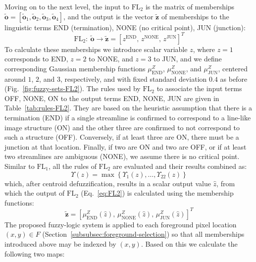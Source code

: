 \documentclass[twocolumn,natbib]{svjour3}
\begin{document}
Moving on to the next level, the input to $\mathrm{FL}_{2}$ is the matrix of memberships $\tilde{\mathbf{o}}=\left[\tilde{\mathbf{o}}_{1},\tilde{\mathbf{o}}_{2},\tilde{\mathbf{o}}_{3},\tilde{\mathbf{o}}_{4}\right]$, and the output is the vector $\tilde{\mathbf{z}}$ of memberships to the linguistic terms END (termination), NONE (no critical point), JUN (junction):
\begin{equation}
\mathrm{FL}_{2}\!:\ \tilde{\mathbf{o}} \rightarrow \tilde{\mathbf{z}} = \left[z^{\textrm{END}}\!,\, z^{\textrm{NONE}}\!,\, z^{\textrm{JUN}}\right]^T
\label{eq:FL2}
\end{equation}
To calculate these memberships we introduce scalar variable $z$, where $z=1$ corresponds to END, $z=2$ to NONE, and $z=3$ to JUN, and we define corresponding Gaussian membership functions $\mu_{\textrm{END}}^{Z}$, $\mu_{\textrm{NONE}}^{Z}$, and $\mu_{\textrm{JUN}}^{Z}$, centered around $1$, $2$, and $3$, respectively, and with fixed standard deviation $0.4$ as before (Fig.~\ref{fig:fuzzy-sets-FL2}). The rules used by $\mathrm{FL}_{2}$ to associate the input terms OFF, NONE, ON to the output terms END, NONE, JUN are given in Table~\ref{tab:rules-FL2}. They are based on the heuristic assumption that there is a termination (END) if a single streamline is confirmed to correspond to a line-like image structure (ON) and the other three are confirmed to not correspond to such a structure (OFF). Conversely, if at least three are ON, there must be a junction at that location. Finally, if two are ON and two are OFF, or if at least two streamlines are ambiguous (NONE), we assume there is no critical point. Similar to $\mathrm{FL}_{1}$, all the rules of $\mathrm{FL}_{2}$ are evaluated and their results combined as:
\begin{equation}
\Upsilon(z) = \max\left\{\Upsilon_{1}(z),\dots,\Upsilon_{22}(z)\right\}
\end{equation}
which, after centroid defuzzification, results in a scalar output value $\hat{z}$, from which the output of $\mathrm{FL}_{2}$ (Eq.~\ref{eq:FL2}) is calculated using the membership functions:
\begin{equation}
\tilde{\mathbf{z}} = \left[\mu_{\textrm{END}}^{Z}(\hat{z}),\, \mu_{\textrm{NONE}}^{Z}(\hat{z}),\, \mu_{\textrm{JUN}}^{Z}(\hat{z})\right]^{T}
\end{equation}
The proposed fuzzy-logic system is applied to each foreground pixel location $(x,y)\in F$ (Section~\ref{subsubsec:foreground-selection}) so that all memberships introduced above may be indexed by $(x,y)$. Based on this we calculate the following two maps:
\end{document}
